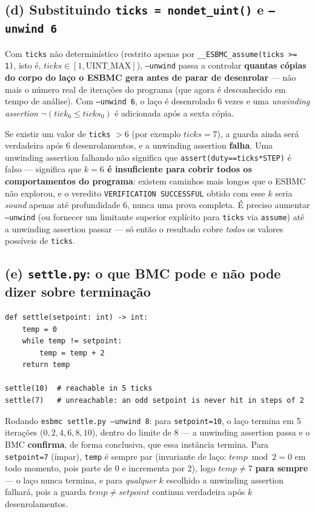 \documentclass[12pt,a4paper]{article}
\newcommand{\vv}[1]{\texttt{#1}}
\begin{document}
\subsection{(d) Substituindo \texttt{ticks = nondet\_uint()} e \texttt{--unwind 6}}

Com \vv{ticks} n\~ao determin\'istico (restrito apenas por
\vv{\_\_ESBMC\_assume(ticks >= 1)}, isto \'e, $ticks\in[1, \mathrm{UINT\_MAX}]$),
\texttt{--unwind} passa a controlar \textbf{quantas c\'opias do corpo do la\c{c}o o ESBMC
gera antes de parar de desenrolar} --- n\~ao mais o n\'umero real de itera\c{c}\~oes do
programa (que agora \'e desconhecido em tempo de an\'alise). Com \texttt{--unwind 6}, o
la\c{c}o \'e desenrolado 6 vezes e uma \emph{unwinding assertion} $\neg(tick_6\le ticks_0)$
\'e adicionada ap\'os a sexta c\'opia.

\begin{tcolorbox}[resultbox]
Se existir um valor de \vv{ticks} $>6$ (por exemplo $ticks=7$), a guarda ainda ser\'a
verdadeira ap\'os 6 desenrolamentos, e a unwinding assertion \textbf{falha}. Uma unwinding
assertion falhando n\~ao significa que \texttt{assert(duty==ticks*STEP)} \'e falso ---
significa que \textbf{$k=6$ \'e insuficiente para cobrir todos os comportamentos do
programa}: existem caminhos mais longos que o ESBMC n\~ao explorou, e o veredito
\texttt{VERIFICATION SUCCESSFUL} obtido com esse $k$ seria \emph{sound} apenas at\'e
profundidade 6, nunca uma prova completa. \'E preciso aumentar \texttt{--unwind} (ou
fornecer um limitante superior expl\'icito para \vv{ticks} via \texttt{assume}) at\'e a
unwinding assertion passar --- s\'o ent\~ao o resultado cobre \emph{todos} os valores
poss\'iveis de \vv{ticks}.
\end{tcolorbox}

\subsection{(e) \texttt{settle.py}: o que BMC pode e n\~ao pode dizer sobre termina\c{c}\~ao}

\begin{lstlisting}[style=pystyle,caption={exercises/ecps/settle.py}]
def settle(setpoint: int) -> int:
    temp = 0
    while temp != setpoint:
        temp = temp + 2
    return temp

settle(10)  # reachable in 5 ticks
settle(7)   # unreachable: an odd setpoint is never hit in steps of 2
\end{lstlisting}

Rodando \texttt{esbmc settle.py --unwind 8}: para \vv{setpoint=10}, o la\c{c}o termina em
5 itera\c{c}\~oes ($0,2,4,6,8,10$), dentro do limite de 8 --- a unwinding assertion passa e
o BMC \textbf{confirma}, de forma conclusiva, que essa inst\^ancia termina. Para
\vv{setpoint=7} (\'impar), \vv{temp} \'e sempre par (invariante de la\c{c}o: $temp \bmod 2
= 0$ em todo momento, pois parte de 0 e incrementa por 2), logo $temp\neq7$ \textbf{para
sempre} --- o la\c{c}o nunca termina, e para \emph{qualquer} $k$ escolhido a unwinding
assertion falhar\'a, pois a guarda $temp\neq setpoint$ continua verdadeira ap\'os $k$
desenrolamentos.
\end{document}

